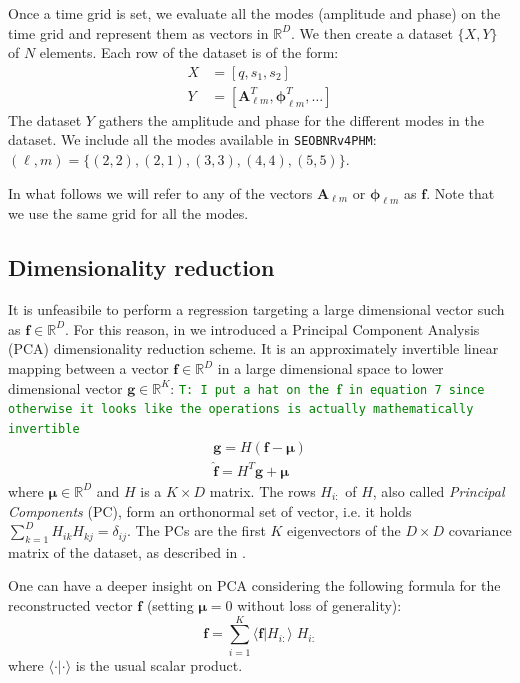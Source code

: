 \documentclass[twocolumn,showpacs,preprintnumbers,nofootinbib,prd,
superscriptaddress,10pt]{revtex4-1}
\newcommand{\R}{\mathbb{R}}
\newcommand{\tim}[1]{{\textcolor{green}{\texttt{T: #1}} }}
\begin{document}
Once a time grid is set, we evaluate all the modes (amplitude and phase) on the time grid and represent them as vectors in $\R^D$.
We then create a dataset $\{X, Y\}$ of $N$ elements. Each row of the dataset is of the form:
\begin{align}
	X &= [q, s_1, s_2] \\
	Y &= [\boldsymbol{A}^T_{\ell m}, \boldsymbol{\phi}^T_{\ell m}, \hdots ] 
\end{align}
%
The dataset $Y$ gathers the amplitude and phase for the different modes in the dataset.
We include all the modes available in \texttt{SEOBNRv4PHM}: $(\ell, m) = \{(2,2),(2,1), (3,3), (4,4), (5,5)\}$.

In what follows we will refer to any of the vectors $\boldsymbol{A}_{\ell m}$ or $\boldsymbol{\phi}_{\ell m}$ as $\boldsymbol{f}$.
Note that we use the same grid for all the modes.

\subsection{Dimensionality reduction}
\label{sec:PCA}

It is unfeasibile to perform a regression targeting a large dimensional vector such as $\boldsymbol{f} \in \R^D$. For this reason, in \cite{Schmidt:2020yuu} we introduced a Principal Component Analysis (PCA) dimensionality reduction scheme.
It is an approximately invertible linear mapping between a vector $\boldsymbol{f} \in \R^D$ in a large dimensional space to lower dimensional vector  $\boldsymbol{g} \in \R^K$: \tim{I put a hat on the $\mathbf{f}$ in equation 7 since otherwise it looks like the operations is actually mathematically invertible}
%
\begin{align}
	\mathbf{g} = H (\mathbf{f} - \boldsymbol{\mu}) \label{eq:PCA_reduction_model}\\
	\hat{\mathbf{f}} = H^T \mathbf{g} + \boldsymbol{\mu} \label{eq:PCA_reconstruction_model}
\end{align}
where $\boldsymbol{\mu} \in \R^D$ and $H$ is a $K \times D$ matrix. The rows $H_{i:}$ of $H$, also called {\it Principal Components} (PC), form an orthonormal set of vector, i.e. it holds ${\sum_{k=1}^D H_{ik} H_{kj} = \delta_{ij}}$.
The PCs are the first $K$ eigenvectors of the $D \times D$ covariance matrix of the dataset, as described in \cite[Sec. 12]{murphy2012machine}.

One can have a deeper insight on PCA considering the following formula for the reconstructed vector $\mathbf{f}$ (setting $\boldsymbol{\mu}=0$ without loss of generality):
\begin{equation} \label{eq:perturbative_exp}
	\mathbf{f} = \sum_{i=1}^K \langle \mathbf{f} | H_{i:} \rangle \; H_{i:}
\end{equation}
%
where $\langle \cdot | \cdot \rangle$ is the usual scalar product.
\end{document}
